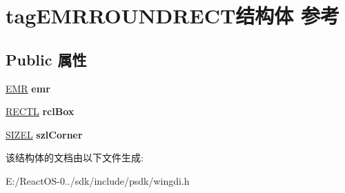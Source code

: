 \hypertarget{structtag_e_m_r_r_o_u_n_d_r_e_c_t}{}\section{tag\+E\+M\+R\+R\+O\+U\+N\+D\+R\+E\+C\+T结构体 参考}
\label{structtag_e_m_r_r_o_u_n_d_r_e_c_t}
\subsection*{Public 属性}
\begin{DoxyCompactItemize}
\item 
\mbox{\label{structtag_e_m_r_r_o_u_n_d_r_e_c_t_acee0e02b433a2318c23e80ad8e31d7f3}} 
\hyperlink{structtag_e_m_r}{E\+MR} {\bfseries emr}
\item 
\mbox{\label{structtag_e_m_r_r_o_u_n_d_r_e_c_t_a3f864e34dbf930199f9ac5c50e56e424}} 
\hyperlink{struct___r_e_c_t_l}{R\+E\+C\+TL} {\bfseries rcl\+Box}
\item 
\mbox{\label{structtag_e_m_r_r_o_u_n_d_r_e_c_t_a5c6212ab5f2e9da37fb098b4c108b0fe}} 
\hyperlink{structtag_s_i_z_e}{S\+I\+Z\+EL} {\bfseries szl\+Corner}
\end{DoxyCompactItemize}


该结构体的文档由以下文件生成\+:\begin{DoxyCompactItemize}
\item 
E\+:/\+React\+O\+S-\/0../sdk/include/psdk/wingdi.\+h\end{DoxyCompactItemize}
